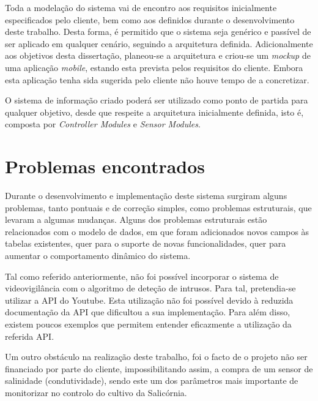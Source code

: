 Toda a modelação do sistema vai de encontro aos requisitos inicialmente especificados pelo cliente, bem como aos definidos durante o desenvolvimento deste trabalho. Desta forma, é permitido que o sistema seja genérico e passível de ser aplicado em qualquer cenário, seguindo a arquitetura definida. Adicionalmente aos objetivos desta dissertação, planeou-se a arquitetura e criou-se um \textit{mockup} de uma aplicação \textit{mobile}, estando esta prevista pelos requisitos do cliente. Embora esta aplicação tenha sida sugerida pelo cliente não houve tempo de a concretizar. 


O sistema de informação criado poderá ser utilizado como ponto de partida para qualquer objetivo, desde que respeite a arquitetura inicialmente definida, isto é, composta por \textit{Controller Modules} e \textit{Sensor Modules}. 



\section{Problemas encontrados}


Durante o desenvolvimento e implementação deste sistema surgiram alguns problemas, tanto pontuais e de correção simples, como
problemas estruturais, que levaram a algumas mudanças. Alguns dos problemas estruturais estão relacionados com o modelo de dados, em que foram adicionados novos campos às tabelas existentes, quer para o suporte de novas funcionalidades, quer para aumentar o comportamento dinâmico do sistema.


Tal como referido anteriormente, não foi possível incorporar o sistema de videovigilância com o algoritmo de deteção de intrusos. Para tal, pretendia-se utilizar a \ac{API} do Youtube. Esta utilização não foi possível devido à reduzida documentação da \ac{API} que dificultou a sua implementação. Para além disso, existem poucos exemplos que permitem entender eficazmente a utilização da referida \ac{API}. 

Um outro obstáculo na realização deste trabalho, foi o facto de o projeto não ser financiado por parte do cliente, impossibilitando assim, a compra de um sensor de salinidade (condutividade), sendo este um dos parâmetros mais importante de monitorizar no controlo do cultivo da Salicórnia. 







